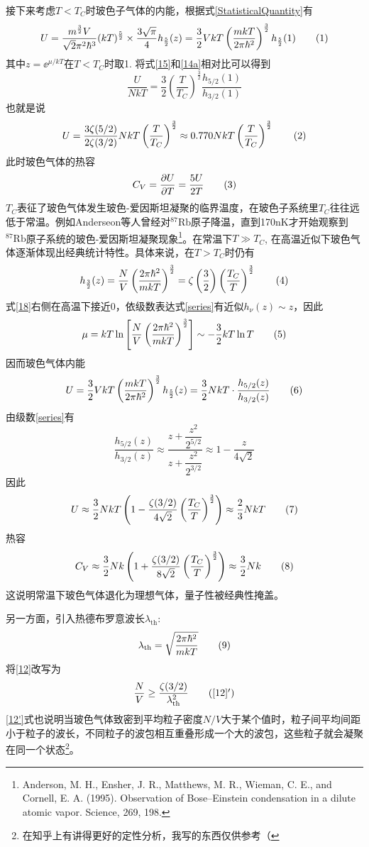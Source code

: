 \documentclass[]{article}
\begin{document}
	接下来考虑$ T<T_C $时玻色子气体的内能，根据式\eqref{StatisticalQuantity}有
	\[\label{15}U=\frac{m^{\frac 32}V}{\sqrt{2}\pi^2\hbar^3}(kT)^{\frac 52}\times \frac{3\sqrt{\pi}}{4}h_{\frac 52}(z)=\frac 32VkT\left(\frac{mkT}{2\pi\hbar^2}\right)^{\frac 32}h_{\frac 52}(1)\taghere\]
	其中$ z=\ee^{\mu/kT} $在$ T<T_C $时取1. 将式\eqref{15}和\eqref{14a}相对比可以得到
	\[\frac{U}{NkT}=\frac 32\left(\frac{T}{T_C}\right)^{\frac 32}\frac{h_{5/2}(1)}{h_{3/2}(1)}\]
	也就是说
	\[U=\frac{3\zeta(5/2)}{2\zeta(3/2)}NkT\left(\frac{T}{T_C}\right)^{\frac 32}\approx0.770NkT\left(\frac{T}{T_C}\right)^{\frac 32}\taghere\]
	此时玻色气体的热容
	\[C_V=\parDer UT=\frac{5U}{2T}\taghere\]
	$ T_C $表征了玻色气体发生玻色-爱因斯坦凝聚的临界温度，在玻色子系统里$ T_C $往往远低于常温。例如Anderseon等人曾经对$ ^{87}\text{Rb} $原子降温，直到170nK才开始观察到$ ^{87}\text{Rb} $原子系统的玻色-爱因斯坦凝聚现象\footnote{Anderson, M. H., Ensher, J. R., Matthews, M. R., Wieman, C. E., and Cornell, E. A. (1995). Observation of Bose–Einstein condensation in a dilute atomic vapor. Science, 269, 198.}。在常温下$ T\gg T_C $, 在高温近似下玻色气体逐渐体现出经典统计特性。具体来说，在$ T>T_C $时仍有
	\[\label{18}h_{\frac 32}(z)=\frac NV\left(\frac{2\pi\hbar^2}{mkT}\right)^{\frac 32}=\zeta\left(\frac 32\right)\left(\frac{T_C}{T}\right)^{\frac 32}\taghere\]
	式\eqref{18}右侧在高温下接近0，依级数表达式\eqref{series}有近似$ h_{\nu}(z)\sim z $，因此
	\[\mu=kT\ln\left[\frac NV\left(\frac{2\pi\hbar^2}{mkT}\right)^{\frac 32}\right]\sim-\frac 32kT\ln T\taghere\]
	因而玻色气体内能
	\[U=\frac 32VkT\left(\frac{mkT}{2\pi\hbar^2}\right)^{\frac 32}h_{\frac 52}(z)=\frac 32NkT\cdot \frac{h_{5/2}(z)}{h_{3/2}(z)}\taghere\]
	由级数\eqref{series}有
	\[\frac{h_{5/2}(z)}{h_{3/2}(z)}\approx\frac{z+\dfrac{z^2}{2^{5/2}}}{z+\dfrac{z^2}{2^{3/2}}}\approx1-\frac{z}{4\sqrt{2}}\]
	因此
	\[U\approx\frac 32NkT\left(1-\frac{\zeta(3/2)}{4\sqrt{2}}\left(\frac{T_C}{T}\right)^{\frac 32}\right)\approx\frac 23NkT\taghere\]
	热容
	\[C_V\approx\frac 32Nk\left(1+\frac{\zeta(3/2)}{8\sqrt{2}}\left(\frac{T_C}{T}\right)^{\frac 32}\right)\approx\frac 32Nk\taghere\]
	这说明常温下玻色气体退化为理想气体，量子性被经典性掩盖。
	
	另一方面，引入热德布罗意波长$ \lambda_{\text{th}} $:
	\[\lambda_{\text{th}}=\sqrt{\frac{2\pi\hbar^2}{mkT}}\taghere\]
	将\eqref{12}改写为
	\[\label{12'}\frac NV\ge\frac{\zeta(3/2)}{\lambda_{\text{th}}^2}\tag{\ref{12}$ ' $}\]
	\eqref{12'}式也说明当玻色气体致密到平均粒子密度$ N/V $大于某个值时，粒子间平均间距小于粒子的波长，不同粒子的波包相互重叠形成一个大的波包，这些粒子就会凝聚在同一个状态\footnote{在知乎上有讲得更好的定性分析，我写的东西仅供参考（}。
\end{document}
